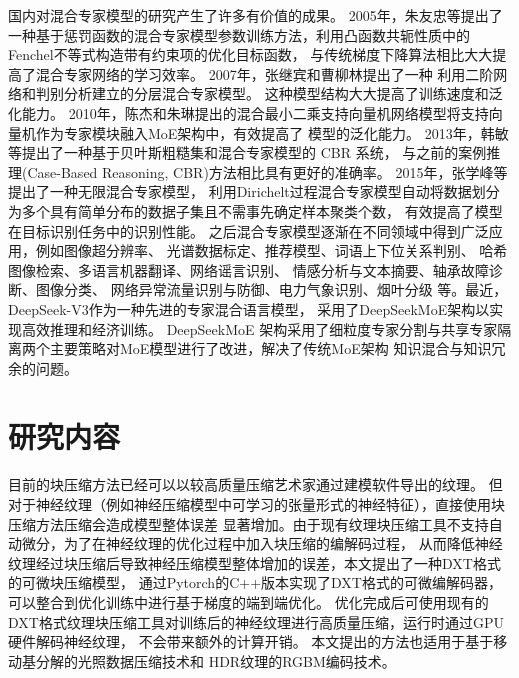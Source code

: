 国内对混合专家模型的研究产生了许多有价值的成果。
2005年，朱友忠等\cite{JSJZ200505058}提出了一种基于惩罚函数的混合专家模型参数训练方法，利用凸函数共轭性质中的Fenchel不等式构造带有约束项的优化目标函数，
与传统梯度下降算法相比大大提高了混合专家网络的学习效率。
2007年，张继宾和曹柳林\cite{ASGT200704005}提出了一种
利用二阶网络和判别分析建立的分层混合专家模型。
这种模型结构大大提高了训练速度和泛化能力。
2010年，陈杰和朱琳\cite{KZLY201003005}提出的混合最小二乘支持向量机网络模型将支持向量机作为专家模块融入MoE架构中，有效提高了
模型的泛化能力。
2013年，韩敏等\cite{KZYC201301029}提出了一种基于贝叶斯粗糙集和混合专家模型的 CBR 系统，
与之前的案例推理(Case-Based Reasoning, CBR)方法相比具有更好的准确率。
2015年，张学峰等\cite{DZYX201501005}提出了一种无限混合专家模型，
利用Dirichelt过程混合专家模型自动将数据划分为多个具有简单分布的数据子集且不需事先确定样本聚类个数，
有效提高了模型在目标识别任务中的识别性能。
之后混合专家模型逐渐在不同领域中得到广泛应用，例如图像超分辨率\cite{1015982120.nh}、
光谱数据标定\cite{MOTO201604008}、推荐模型\cite{1023813150.nh}、词语上下位关系判别\cite{JSJA202302029}、
哈希图像检索\cite{1024896566.nh}、多语言机器翻译\cite{1025224898.nh}、网络谣言识别\cite{JCJS202306015}、
情感分析与文本摘要\cite{XDDJ202401017}、轴承故障诊断\cite{JSJY202501007}、图像分类\cite{JLDX202404018}、
网络异常流量识别与防御\cite{XXAQ202409013}、电力气象识别\cite{GWDZ202424018}、烟叶分级\cite{WJFZ2025042300F}
等。最近，DeepSeek-V3\cite{liu2024deepseek}作为一种先进的专家混合语言模型，
采用了DeepSeekMoE架构\cite{dai2024deepseekmoe}以实现高效推理和经济训练。
DeepSeekMoE 架构采用了细粒度专家分割与共享专家隔离两个主要策略对MoE模型进行了改进，解决了传统MoE架构
知识混合与知识冗余的问题。

\section{研究内容}

目前的块压缩方法已经可以以较高质量压缩艺术家通过建模软件导出的纹理。
但对于神经纹理（例如神经压缩模型中可学习的张量形式的神经特征），直接使用块压缩方法压缩会造成模型整体误差
显著增加。由于现有纹理块压缩工具不支持自动微分，为了在神经纹理的优化过程中加入块压缩的编解码过程，
从而降低神经纹理经过块压缩后导致神经压缩模型整体增加的误差，本文提出了一种DXT格式的可微块压缩模型，
通过Pytorch的C++版本实现了DXT格式的可微编解码器，可以整合到优化训练中进行基于梯度的端到端优化。
优化完成后可使用现有的DXT格式纹理块压缩工具对训练后的神经纹理进行高质量压缩，运行时通过GPU硬件解码神经纹理，
不会带来额外的计算开销。
本文提出的方法也适用于基于移动基分解的光照数据压缩技术\cite{silvennoinen2021moving}和
HDR纹理的RGBM编码技术。

